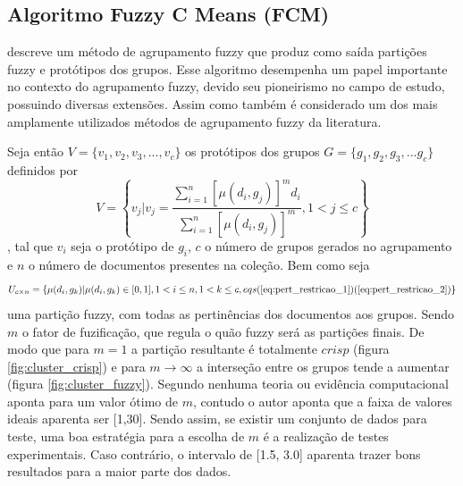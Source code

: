 \subsection{Algoritmo Fuzzy C Means (FCM)}
\cite{Bezdek1984} descreve um método de agrupamento fuzzy que produz como saída partições 
fuzzy e protótipos dos grupos. Esse algoritmo desempenha um papel importante no
contexto do agrupamento fuzzy, devido seu pioneirismo no campo de estudo, possuindo diversas
extensões. Assim como também é considerado um dos mais amplamente utilizados métodos de agrupamento
fuzzy da literatura\cite{Pal2005}.

Seja então $V = \{v_1,v_2,v_3,...,v_c\}$ os protótipos dos grupos $G = \{g_1,g_2,g_3,...g_c\}$ 
definidos por
\begin{equation}
  V = \left\{ 
    v_j | v_j = \frac{\sum_{i=1}^n[\mu(d_i,g_j)]^m d_i}{\sum_{i=1}^n[\mu(d_i,g_j)]^m}, 
  1 < j \leq c
\right\}
  \label{eq:prototipos}
\end{equation}
, 
tal que $v_i$ seja o protótipo de $g_i$, $c$ o número de grupos gerados no agrupamento e $n$ o
número de documentos presentes na coleção. Bem como
seja 
\begin{equation}
  U_{c \times n} = \{\mu(d_i, g_k) | \mu(d_i, g_k) \in [0,1], 1 < i \leq n, 1 < k \leq c, 
  eqs (\ref{eq:pert_restricao_1})(\ref{eq:pert_restricao_2})\}
  \label{eq:part_fuzzy}
\end{equation}
uma partição fuzzy, com todas as pertinências dos documentos aos grupos. Sendo $m$ 
o fator de fuzificação, que regula o quão fuzzy será as partições
finais. De modo que para $m = 1$ a partição resultante é totalmente $crisp$ 
(figura \ref{fig:cluster_crisp}) e para 
$m \rightarrow \infty$ a interseção entre os grupos tende a 
aumentar (figura \ref{fig:cluster_fuzzy})\cite{Pal2005}\cite{Nogueira2013}. Segundo \cite{Bezdek1984} nenhuma teoria ou evidência
computacional aponta para um valor ótimo de $m$, contudo o autor aponta que a faixa de valores 
ideais aparenta ser [1,30]. Sendo assim, se existir um conjunto de dados para teste, uma boa 
estratégia para a escolha de $m$ é a realização de testes experimentais. Caso contrário,
o intervalo de [1.5, 3.0] aparenta trazer bons resultados para a maior parte dos dados.

